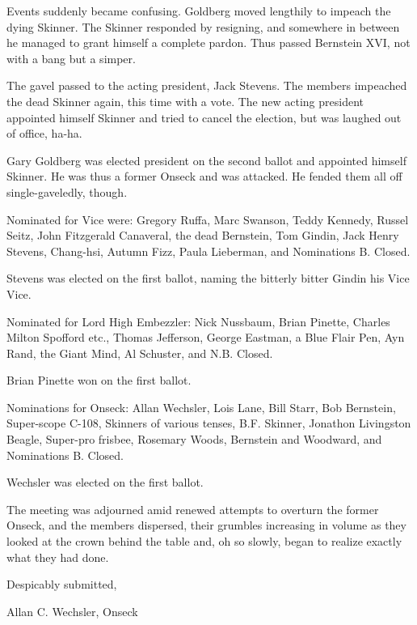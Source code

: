 \documentclass[12pt]{article}
\begin{document}
Events suddenly became confusing. Goldberg moved lengthily to impeach the dying Skinner. The Skinner responded by resigning, and somewhere in between he managed to grant himself a complete pardon. Thus passed Bernstein XVI, not with a bang but a simper.

The gavel passed to the acting president, Jack Stevens. The members impeached the dead Skinner again, this time with a vote. The new acting president appointed himself Skinner and tried to cancel the election, but was laughed out of office, ha-ha.

Gary Goldberg was elected president on the second ballot and appointed himself Skinner. He was thus a former Onseck and was attacked. He fended them all off single-gaveledly, though.

Nominated for Vice were: Gregory Ruffa, Marc Swanson, Teddy Kennedy, Russel Seitz, John Fitzgerald Canaveral, the dead Bernstein, Tom Gindin, Jack Henry Stevens, Chang-hsi, Autumn Fizz, Paula Lieberman, and Nominations B. Closed.

Stevens was elected on the first ballot, naming the bitterly bitter Gindin his Vice Vice.

Nominated for Lord High Embezzler: Nick Nussbaum, Brian Pinette, Charles Milton Spofford etc., Thomas Jefferson, George Eastman, a Blue Flair Pen, Ayn Rand, the Giant Mind, Al Schuster, and N.B. Closed.

Brian Pinette won on the first ballot.

Nominations for Onseck: Allan Wechsler, Lois Lane, Bill Starr, Bob Bernstein, Super-scope C-108, Skinners of various tenses, B.F. Skinner, Jonathon Livingston Beagle, Super-pro frisbee, Rosemary Woods, Bernstein and Woodward, and Nominations B. Closed.

Wechsler was elected on the first ballot.

The meeting was adjourned amid renewed attempts to overturn the former Onseck, and the members dispersed, their grumbles increasing in volume as they looked at the crown behind the table and, oh so slowly, began to realize exactly what they had done.

\vspace{12pt}

\centerline{Despicably submitted,}
\centerline{Allan C. Wechsler, Onseck}
\end{document}
